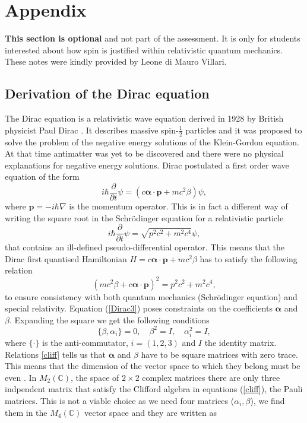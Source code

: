 \documentclass[a4paper,11pt]{article}
\newcommand{\beq}{\begin{equation}}
\newcommand{\eeq}{\end{equation}}
\newcommand{\p}{\mathbf{p}}
\begin{document}
\section {Appendix}
{\bf This section is optional} and not part of the assessment. It is only for students interested about how spin is justified within relativistic quantum mechanics. These notes were kindly provided by Leone di Mauro Villari.

\subsection{Derivation of the Dirac equation}
\label{sec:dirac}
The Dirac equation is a relativistic wave equation derived in 1928 by British physicist Paul Dirac \cite{DiracP}. It describes massive spin-$\frac{1}2$ particles and it was proposed to solve the problem of the negative energy solutions of the Klein-Gordon equation. At that time antimatter was yet to be discovered and there were no physical explanations for negative energy solutions. Dirac postulated a first order wave equation of the form 
\beq \label{Dirac1}
i \hbar \frac{\partial}{\partial t} \psi = ( c \boldsymbol{\alpha} \cdot \mathbf{p} + m c^2 \beta ) \psi,
\eeq
where $\p=- i \hbar \nabla$ is the momentum operator.  This is in fact a different way of writing the square root in the Schr\"odinger equation for a relativistic particle 
\beq  \label{Dirac2}
i \hbar \frac{\partial}{\partial t} \psi = \sqrt{p^2c^2 + m^2 c^4} \psi,
\eeq
that contains an ill-defined pseudo-differential operator. This means that the Dirac first quantised Hamiltonian $H =  c \boldsymbol{\alpha} \cdot \mathbf{p} + m c^2 \beta $ has to satisfy the following relation 
\beq  \label{Dirac3}
  (m c^2 \beta + c \boldsymbol{\alpha} \cdot \mathbf{p}) ^2 =  p^2c^2 + m^2 c^4, 
\eeq
to ensure consistency with both quantum mechanics (Schr\"odinger equation) and special relativity. Equation (\ref{Dirac3}) poses constraints on the coefficients $\boldsymbol \alpha$ and $\beta$. Expanding the square we get the following conditions 
\beq \label{cliff}
\{\beta, \alpha_i\} = 0, \quad \beta^2 = I, \quad \alpha_i^2 = I,
\eeq
where $\{\cdot \}$ is the anti-commutator, $i = (1,2,3)$ and $I$ the identity matrix. Relations \ref{cliff} tells us that $\boldsymbol \alpha$ and $\beta$ have to be square matrices with zero trace.  This means that the dimension of the vector space to which they belong must be even \cite{bd}. In $M_2(\mathbb{C})$, the space of $2 \times 2$ complex matrices there are only three indpendent matrix that satisfy the Clifford algebra in equations (\ref{cliff}), the Pauli matrices. This is not a viable choice as we need four matrices ($\alpha_i,\beta$), we find them in the $M_4(\mathbb{C})$ vector space and they are written as 
\end{document}
